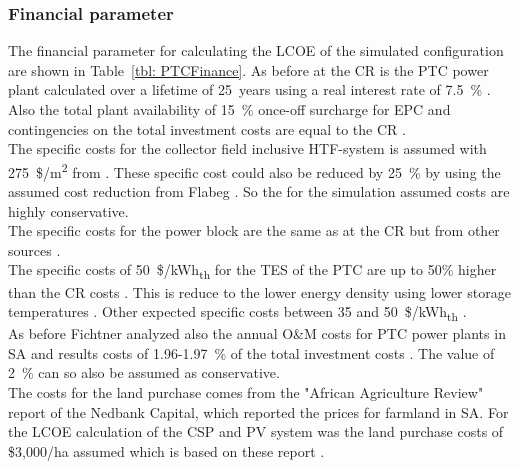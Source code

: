 \documentclass[Master,MEE,english]{twbook}%
\begin{document}
\subsubsection{Financial parameter}
The financial parameter for calculating the LCOE of the simulated configuration are shown in Table~\ref{tbl: PTCFinance}. As before at the CR is the PTC power plant calculated over a lifetime of 25~years using a real interest rate of 7.5~\% \cite{FraunhoferISE2013}. Also the total plant availability of  15~\% once-off surcharge for EPC and contingencies on the total investment costs are equal to the CR \cite{Platzer2014}.
\\
The specific costs for the collector field inclusive HTF-system is assumed with 275~\$/m\textsuperscript{2} from \cite{Morin2012}. These specific cost could also be reduced by 25~\% by using the assumed cost reduction from Flabeg \cite{FLABEG_FE_GmbH2015}. So the for the simulation assumed costs are highly conservative.\\
The specific costs for the power block are the same as at the CR but from other sources \cite{Platzer2014}. \\
The specific costs of 50~\$/kWh\textsubscript{th} for the TES of the PTC are up to 50\% higher than the CR costs \cite{Platzer2014}. This is reduce to the lower energy density using lower storage temperatures \cite{Steinmann2015}. Other expected specific costs between 35 and 50~\$/kWh\textsubscript{th}  \cite{Steinmann2012}.\\
As before Fichtner analyzed also the annual O\&M costs for PTC power plants in SA and results costs of 1.96-1.97~\% of the total investment costs \cite{Fichtner2010}. The value of 2~\% can so also be assumed as conservative.\\
The costs for the land purchase comes from the "African Agriculture Review" report of the Nedbank Capital, which reported the prices for farmland in SA. For the LCOE calculation of the CSP and PV system was the land purchase costs of \$3,000/ha assumed which is based on these report \cite{Cassell2012}.
\end{document}
